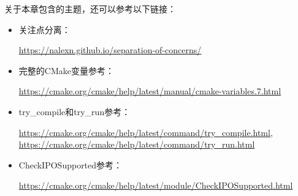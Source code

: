 关于本章包含的主题，还可以参考以下链接：

\begin{itemize}
\item
关注点分离：

\url{https://nalexn.github.io/separation-of-concerns/}

\item
完整的CMake变量参考：

\url{https://cmake.org/cmake/help/latest/manual/cmake-variables.7.html}

\item
try\_compile和try\_run参考：

\url{https://cmake.org/cmake/help/latest/command/try_compile.html}, \url{https://cmake.org/cmake/help/latest/command/try_run.html}

\item
CheckIPOSupported参考：

\url{https://cmake.org/cmake/help/latest/module/CheckIPOSupported.html}
\end{itemize}
